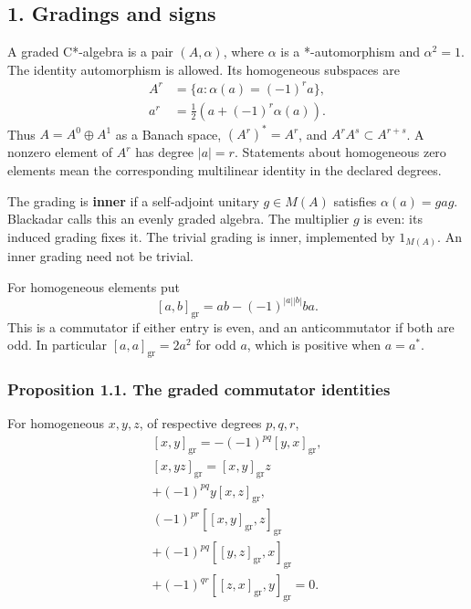 \documentclass[
  11pt,
]{article}
\begin{document}
\subsection{1. Gradings and signs}\label{gradings-and-signs}

A graded C*-algebra is a pair \((A,\alpha)\), where \(\alpha\) is a
*-automorphism and \(\alpha^2=1\). The identity automorphism is allowed.
Its homogeneous subspaces are \[
\begin{aligned}
A^r&=\{a:\alpha(a)=(-1)^ra\},\\
a^r&=\tfrac12(a+(-1)^r\alpha(a)).
\end{aligned}
\tag{1.1}
\] Thus \(A=A^0\oplus A^1\) as a Banach space, \((A^r)^*=A^r\), and
\(A^rA^s\subset A^{r+s}\). A nonzero element of \(A^r\) has degree
\(|a|=r\). Statements about homogeneous zero elements mean the
corresponding multilinear identity in the declared degrees.

The grading is \textbf{inner} if a self-adjoint unitary \(g\in M(A)\)
satisfies \(\alpha(a)=gag\). Blackadar calls this an evenly graded
algebra. The multiplier \(g\) is even: its induced grading fixes it. The
trivial grading is inner, implemented by \(1_{M(A)}\). An inner grading
need not be trivial.

For homogeneous elements put \[
\left[a,b\right]_{\mathrm{gr}}
=ab-(-1)^{|a||b|}ba.
\tag{1.2}
\] This is a commutator if either entry is even, and an anticommutator
if both are odd. In particular \([a,a]_{\mathrm{gr}}=2a^2\) for odd
\(a\), which is positive when \(a=a^*\).

\subsubsection{Proposition 1.1. The graded commutator
identities}\label{proposition-1.1.-the-graded-commutator-identities}

For homogeneous \(x,y,z\), of respective degrees \(p,q,r\), \[
\begin{gathered}
\left[x,y\right]_{\mathrm{gr}}=-(-1)^{pq}[y,x]_{\mathrm{gr}},\\
[x,yz]_{\mathrm{gr}}=[x,y]_{\mathrm{gr}}z\\
+(-1)^{pq}y[x,z]_{\mathrm{gr}},\\
(-1)^{pr}[[x,y]_{\mathrm{gr}},z]_{\mathrm{gr}}\\
+(-1)^{pq}[[y,z]_{\mathrm{gr}},x]_{\mathrm{gr}}\\
+(-1)^{qr}[[z,x]_{\mathrm{gr}},y]_{\mathrm{gr}}=0.
\end{gathered}
\tag{1.3}
\]
\end{document}
